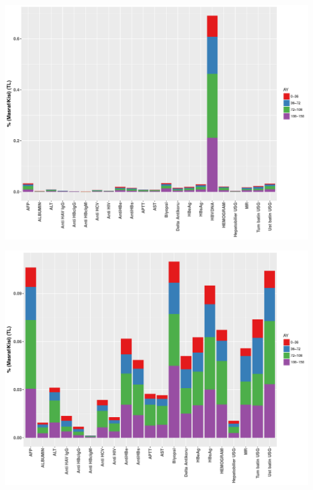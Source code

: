 



\begin{minipage}{0.49\textwidth}
 \begin{center}
 	\includegraphics[width=1\linewidth, height=0.35\textheight]{../Figures/Fig5}
 	\end{center}
 	  \label{fig:Fig5}	
\end{minipage}
\begin{minipage}{0.49\textwidth}
	\begin{center}
	\includegraphics[width=1\linewidth, height=0.35\textheight]{../Figures/Fig6}
	\end{center}
	  \label{fig:Fig6}
\end{minipage}\\  









